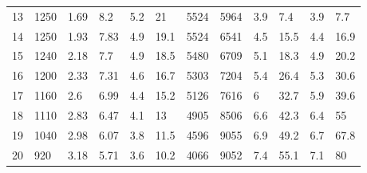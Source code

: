 \documentclass[12pt, a4paper]{article}
\begin{document}
\begin{sidewaystable}
\begin{tabular}[p]{| M{1cm} | M{1.5cm} | M{1.5cm} | M{1.5cm} | M{1.5cm} | M{1.5cm} | M{1.5cm} | M{1.5cm} | M{1.5cm} | M{1.5cm} | M{1.5cm} | M{1.5cm} |}
            13 & 1250 & 1.69 & 8.2 & 5.2 & 21 & 5524 & 5964 & 3.9 & 7.4 & 3.9 & 7.7 \\
            14 & 1250 & 1.93 & 7.83 & 4.9 & 19.1 & 5524 & 6541 & 4.5 & 15.5 & 4.4 & 16.9 \\
            15 & 1240 & 2.18 & 7.7 & 4.9 & 18.5 & 5480 & 6709 & 5.1 & 18.3 & 4.9 & 20.2 \\
            16 & 1200 & 2.33 & 7.31 & 4.6 & 16.7 & 5303 & 7204 & 5.4 & 26.4 & 5.3 & 30.6 \\
            17 & 1160 & 2.6 & 6.99 & 4.4 & 15.2 & 5126 & 7616 & 6 & 32.7 & 5.9 & 39.6 \\
            18 & 1110 & 2.83 & 6.47 & 4.1 & 13 & 4905 & 8506 & 6.6 & 42.3 & 6.4 & 55 \\
            19 & 1040 & 2.98 & 6.07 & 3.8 & 11.5 & 4596 & 9055 & 6.9 & 49.2 & 6.7 & 67.8 \\
            20 & 920 & 3.18 & 5.71 & 3.6 & 10.2 & 4066 & 9052 & 7.4 & 55.1 & 7.1 & 80 \\
            \hline
        \end{tabular}
        \label{tb3}
    \end{sidewaystable}
    
\end{document}
